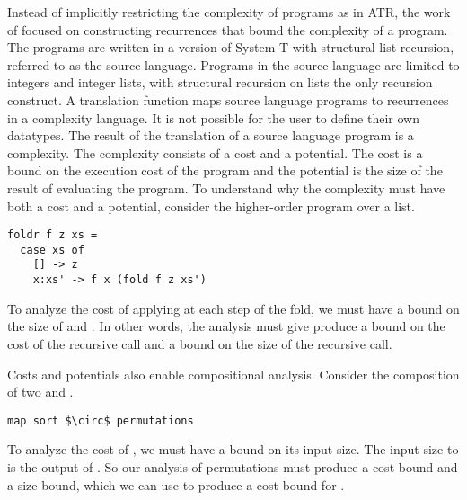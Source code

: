 


Instead of implicitly restricting the complexity of programs as in ATR, the work of
\citet{Danner2013} focused on constructing recurrences that bound the
complexity of a program. The programs are written in a version of System T with
structural list recursion, referred to as the source language.  Programs in the
source language are limited to integers and integer lists, with structural
recursion on lists the only recursion construct.  A translation function maps
source language programs to recurrences in a complexity language.  It is not
possible for the user to define their own datatypes. The result of the
translation of a source language program is a complexity. The complexity
consists of a cost and a potential. The cost is a bound on the execution cost
of the program and the potential is the size of the result of evaluating the
program. To understand why the complexity must have both a cost and a
potential, consider the higher-order program  over a list.
%
\begin{lstlisting}
foldr f z xs =
  case xs of
    [] -> z
    x:xs' -> f x (fold f z xs')
\end{lstlisting}
%
To analyze the cost of applying  at each step of the fold, we must have a
bound on the size of  and . In other words, the analysis
must give produce a bound on the cost of the recursive call and a bound on the
size of the recursive call.

Costs and potentials also enable compositional analysis. Consider the
composition of two  and .
%
\begin{lstlisting}
map sort $\circ$ permutations
\end{lstlisting}
%
To analyze the cost of , we must have a bound on its input size.
The input size to  is the output of . So our
analysis of permutations must produce a cost bound and a size bound, which we
can use to produce a cost bound for .




